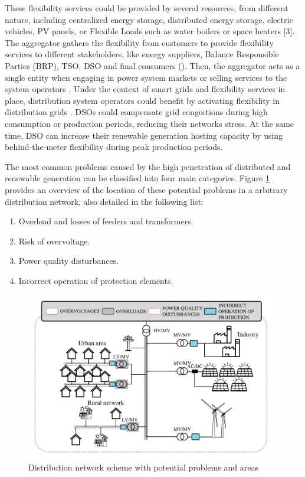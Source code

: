 These flexibility services could be provided by several resources, from different nature, including centralized energy storage, distributed energy storage, electric vehicles, PV panels, or Flexible Loads such as water boilers or space heaters [3]. The aggregator gathers the flexibility from customers to provide flexibility services to different stakeholders, like energy suppliers, Balance Responsible Parties (BRP), TSO, DSO and final consumers (\cite{USEFFoundation2015a, Olivella2018}). Then, the aggregator acts as a single entity when engaging in power system markets or selling services to the system operators \cite{BURGER2017}. Under the context of smart grids and flexibility services in place, distribution system operators could benefit by activating flexibility in distribution grids \cite{USEFFoundation2015a, spiliotis2016demand, esmat2016conf, hashemi2016}. DSOs could compensate grid congestions during high consumption or production periods, reducing their networks stress. At the same time, DSO can increase their renewable generation hosting capacity by using behind-the-meter flexibility during peak production periods. 

The most common problems caused by the high penetration of distributed and renewable generation can be classified into four main categories. Figure \ref{fig:network_problems} provides an overview of the location of these potential problems in a arbitrary distribution network, also detailed in the following list:  

\begin{enumerate}
\item Overload and losses of feeders and transformers. 
\item Risk of overvoltage.
\item Power quality disturbances.
\item Incorrect operation of protection elements. 
\end{enumerate}

\begin{figure}[h]
	\centering
	\includegraphics[width=1\columnwidth]{ChapterOPF_DSO/Figures/network_problems.pdf}
		\caption{Distribution network scheme with potential problems and areas}
	\label{fig:network_problems}  
\end{figure}

